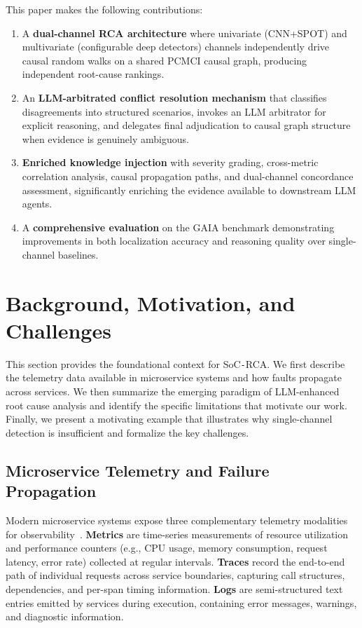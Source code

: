 \documentclass[a4paper,fleqn]{cas-dc}
\newcommand{\sysname}{SoC\texttt{-}RCA}
\begin{document}
This paper makes the following contributions:
\begin{enumerate}[leftmargin=*]
  \item A \textbf{dual-channel RCA architecture} where univariate (CNN+SPOT) and multivariate (configurable deep detectors) channels independently drive causal random walks on a shared PCMCI causal graph, producing independent root-cause rankings.

  \item An \textbf{LLM-arbitrated conflict resolution mechanism} that classifies disagreements into structured scenarios, invokes an LLM arbitrator for explicit reasoning, and delegates final adjudication to causal graph structure when evidence is genuinely ambiguous.

  \item \textbf{Enriched knowledge injection} with severity grading, cross-metric correlation analysis, causal propagation paths, and dual-channel concordance assessment, significantly enriching the evidence available to downstream LLM agents.

  \item A \textbf{comprehensive evaluation} on the GAIA benchmark demonstrating improvements in both localization accuracy and reasoning quality over single-channel baselines.
\end{enumerate}


\section{Background, Motivation, and Challenges}
\label{sec:background}

This section provides the foundational context for \sysname{}.  We first describe the telemetry data available in microservice systems and how faults propagate across services.  We then summarize the emerging paradigm of LLM-enhanced root cause analysis and identify the specific limitations that motivate our work.  Finally, we present a motivating example that illustrates why single-channel detection is insufficient and formalize the key challenges.

\subsection{Microservice Telemetry and Failure Propagation}

Modern microservice systems expose three complementary telemetry modalities for observability~\cite{9213058,10.1145/3338906.3338961,10165686}.  \textbf{Metrics} are time-series measurements of resource utilization and performance counters (e.g., CPU usage, memory consumption, request latency, error rate) collected at regular intervals.  \textbf{Traces} record the end-to-end path of individual requests across service boundaries, capturing call structures, dependencies, and per-span timing information.  \textbf{Logs} are semi-structured text entries emitted by services during execution, containing error messages, warnings, and diagnostic information.
\end{document}
